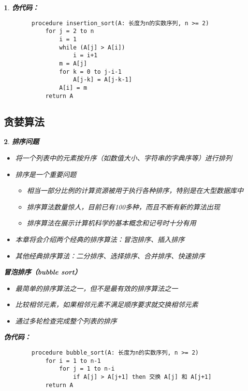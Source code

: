 \documentclass[UTF8]{report}
\theoremstyle{MyLineTheoremStyle} %
\theoremstyle{MyBlockTheoremStyle} %
\theoremstyle{MySubsubsectionStyle} %
\newtheorem{definition}{}
\begin{document}
\begin{definition}
    \textbf{伪代码：}\par
    \begin{verbatim}
        procedure insertion_sort(A: 长度为n的实数序列, n >= 2)
            for j = 2 to n
                i = 1
                while (A[j] > A[i])
                    i = i+1
                m = A[j]
                for k = 0 to j-i-1
                    A[j-k] = A[j-k-1]
                A[i] = m
            return A
    \end{verbatim}
\end{definition}
\subsection{贪婪算法}

\begin{definition}
    \textbf{排序问题}\par
    \begin{itemize}
        \item 将一个列表中的元素按升序（如数值大小、字符串的字典序等）进行排列
        \item 排序是一个重要问题
        \begin{itemize}
            \item 相当一部分比例的计算资源被用于执行各种排序，特别是在大型数据库中
            \item 排序算法数量惊人，目前已有100多种，而且不断有新的算法出现
            \item 排序算法在展示计算机科学的基本概念和记号时十分有用
        \end{itemize}
        \item 本章将会介绍两个经典的排序算法：冒泡排序、插入排序
        \item 其他经典排序算法：二分排序、选择排序、合并排序、快速排序
    \end{itemize}

    \textbf{冒泡排序（bubble sort）}\par
    \begin{itemize}
        \item 最简单的排序算法之一，但不是最有效的排序算法之一
        \item 比较相邻元素，如果相邻元素不满足顺序要求就交换相邻元素
        \item 通过多轮检查完成整个列表的排序
    \end{itemize}

    \textbf{伪代码：}\par
    \begin{verbatim}
        procedure bubble_sort(A: 长度为n的实数序列, n >= 2)
            for i = 1 to n-1
                for j = 1 to n-i
                    if A[j] > A[j+1] then 交换 A[j] 和 A[j+1]
            return A
    \end{verbatim}


\end{definition}
\end{document}
